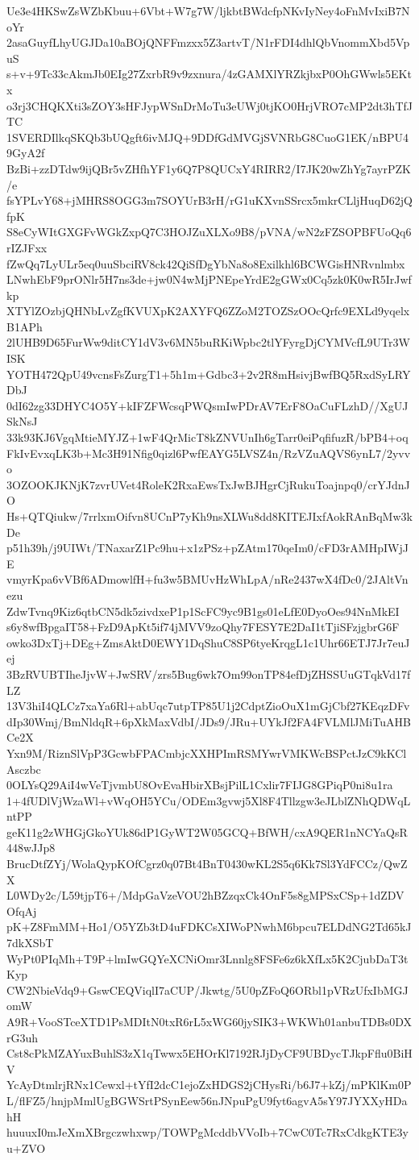 Ue3e4HKSwZsWZbKbuu+6Vbt+W7g7W/ljkbtBWdcfpNKvIyNey4oFnMvIxiB7NoYr
2asaGuyfLhyUGJDa10aBOjQNFFmzxx5Z3artvT/N1rFDI4dhlQbVnommXbd5VpuS
s+v+9Tc33cAkmJb0EIg27ZxrbR9v9zxnura/4zGAMXlYRZkjbxP0OhGWwls5EKtx
o3rj3CHQKXti3sZOY3sHFJypWSnDrMoTu3eUWj0tjKO0HrjVRO7cMP2dt3hTfJTC
1SVERDIlkqSKQb3bUQgft6ivMJQ+9DDfGdMVGjSVNRbG8CuoG1EK/nBPU49GyA2f
BzBi+zzDTdw9ijQBr5vZHfhYF1y6Q7P8QUCxY4RIRR2/I7JK20wZhYg7ayrPZK/e
fsYPLvY68+jMHRS8OGG3m7SOYUrB3rH/rG1uKXvnSSrcx5mkrCLljHuqD62jQfpK
S8eCyWItGXGFvWGkZxpQ7C3HOJZuXLXo9B8/pVNA/wN2zFZSOPBFUoQq6rIZJFxx
fZwQq7LyULr5eq0uuSbciRV8ck42QiSfDgYbNa8o8Exilkhl6BCWGisHNRvnlmbx
LNwhEbF9prONlr5H7ns3de+jw0N4wMjPNEpeYrdE2gGWx0Cq5zk0K0wR5IrJwfkp
XTYlZOzbjQHNbLvZgfKVUXpK2AXYFQ6ZZoM2TOZSzOOcQrfc9EXLd9yqelxB1APh
2lUHB9D65FurWw9ditCY1dV3v6MN5buRKiWpbc2tlYFyrgDjCYMVcfL9UTr3WISK
YOTH472QpU49vcnsFsZurgT1+5h1m+Gdbc3+2v2R8mHsivjBwfBQ5RxdSyLRYDbJ
0dI62zg33DHYC4O5Y+kIFZFWcsqPWQsmIwPDrAV7ErF8OaCuFLzhD//XgUJSkNsJ
33k93KJ6VgqMtieMYJZ+1wF4QrMicT8kZNVUnIh6gTarr0eiPqfifuzR/bPB4+oq
FkIvEvxqLK3b+Mc3H91Nfig0qizl6PwfEAYG5LVSZ4n/RzVZuAQVS6ynL7/2yvvo
3OZOOKJKNjK7zvrUVet4RoleK2RxaEwsTxJwBJHgrCjRukuToajnpq0/crYJdnJO
Hs+QTQiukw/7rrlxmOifvn8UCnP7yKh9nsXLWu8dd8KITEJIxfAokRAnBqMw3kDe
p51h39h/j9UIWt/TNaxarZ1Pc9hu+x1zPSz+pZAtm170qeIm0/cFD3rAMHpIWjJE
vmyrKpa6vVBf6ADmowlfH+fu3w5BMUvHzWhLpA/nRe2437wX4fDc0/2JAltVnezu
ZdwTvnq9Kiz6qtbCN5dk5zivdxeP1p1ScFC9yc9B1gs01eLfE0DyoOes94NnMkEI
s6y8wfBpgaIT58+FzD9ApKt5if74jMVV9zoQhy7FESY7E2DaI1tTjiSFzjgbrG6F
owko3DxTj+DEg+ZmsAktD0EWY1DqShuC8SP6tyeKrqgL1c1Uhr66ETJ7Jr7euJej
3BzRVUBTIheJjvW+JwSRV/zrs5Bug6wk7Om99onTP84efDjZHSSUuGTqkVd17fLZ
13V3hiI4QLCz7xaYa6Rl+abUqc7utpTP85U1j2CdptZioOuX1mGjCbf27KEqzDFv
dIp30Wmj/BmNldqR+6pXkMaxVdbI/JDs9/JRu+UYkJf2FA4FVLMlJMiTuAHBCe2X
Yxn9M/RiznSlVpP3GcwbFPACmbjcXXHPImRSMYwrVMKWcBSPctJzC9kKClAsczbc
0OLYsQ29AiI4wVeTjvmbU8OvEvaHbirXBsjPilL1Cxlir7FIJG8GPiqP0ni8u1ra
1+4fUDlVjWzaWl+vWqOH5YCu/ODEm3gvwj5Xl8F4Tllzgw3eJLblZNhQDWqLntPP
geK11g2zWHGjGkoYUk86dP1GyWT2W05GCQ+BfWH/cxA9QER1nNCYaQsR448wJJp8
BrucDtfZYj/WolaQypKOfCgrz0q07Bt4BnT0430wKL2S5q6Kk7Sl3YdFCCz/QwZX
L0WDy2c/L59tjpT6+/MdpGaVzeVOU2hBZzqxCk4OnF5s8gMPSxCSp+1dZDVOfqAj
pK+Z8FmMM+Ho1/O5YZb3tD4uFDKCsXIWoPNwhM6bpcu7ELDdNG2Td65kJ7dkXSbT
WyPt0PIqMh+T9P+lmIwGQYeXCNiOmr3Lnnlg8FSFe6z6kXfLx5K2CjubDaT3tKyp
CW2NbieVdq9+GswCEQViqlI7aCUP/Jkwtg/5U0pZFoQ6ORbl1pVRzUfxIbMGJomW
A9R+VooSTceXTD1PsMDItN0txR6rL5xWG60jySIK3+WKWh01anbuTDBs0DXrG3uh
Cst8cPkMZAYuxBuhlS3zX1qTwwx5EHOrKl7192RJjDyCF9UBDycTJkpFflu0BiHV
YcAyDtmlrjRNx1Cewxl+tYfI2dcC1ejoZxHDGS2jCHysRi/b6J7+kZj/mPKlKm0P
L/flFZ5/hnjpMmlUgBGWSrtPSynEew56nJNpuPgU9fyt6agvA5sY97JYXXyHDahH
huuuxI0mJeXmXBrgczwhxwp/TOWPgMcddbVVoIb+7CwC0Tc7RxCdkgKTE3yu+ZVO
